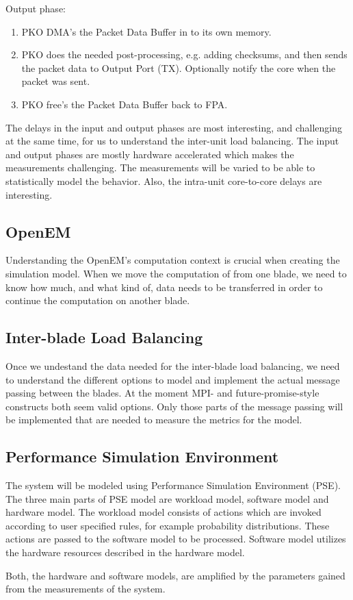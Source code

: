 Output phase:
\begin{enumerate}
\item PKO DMA's the Packet Data Buffer in to its own memory.
\item PKO does the needed post-processing, e.g. adding checksums, and then sends the packet data to Output Port (TX). Optionally notify the core when the packet was sent.
\item PKO free's the Packet Data Buffer back to FPA.
\end{enumerate}

The delays in the input and output phases are most interesting, and challenging at the same time, for us to understand the inter-unit load balancing. The input and output phases are mostly hardware accelerated which makes the measurements challenging. The measurements will be varied to be able to statistically model the behavior. Also, the intra-unit core-to-core delays are interesting.

\subsection{OpenEM}
Understanding the OpenEM's computation context is crucial when creating the simulation model. When we move the computation of from one blade, we need to know how much, and what kind of, data needs to be transferred in order to continue the computation on another blade.

\subsection{Inter-blade Load Balancing}
Once we undestand the data needed for the inter-blade load balancing, we need to understand the different options to model and implement the actual message passing between the blades. At the moment MPI- and future-promise-style constructs both seem valid options. Only those parts of the message passing will be implemented that are needed to measure the metrics for the model.

\subsection{Performance Simulation Environment}
The system will be modeled using Performance Simulation Environment (PSE). The three main parts of PSE  model are workload model, software model and hardware model. The workload model consists of actions which are invoked according to user specified rules, for example probability distributions. These actions are passed to the software model to be processed. Software model utilizes the hardware resources described in the hardware model.

Both, the hardware and software models, are amplified by the parameters gained from the measurements of the system.

